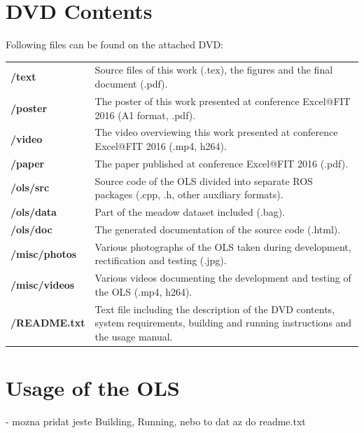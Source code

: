 \chapter{DVD Contents}

Following files can be found on the attached DVD:

{\renewcommand{\arraystretch}{1.2}
\begin{table}[htbp]
	\centering
	\begin{tabularx}{1.0\textwidth}{lX}
		\textbf{/text} & Source files of this work (.tex), the figures and the final document (.pdf). \\
		\textbf{/poster} & The poster of this work presented at conference Excel@FIT 2016 (A1 format, .pdf). \\
		\textbf{/video} & The video  overviewing this work presented at conference Excel@FIT 2016 (.mp4, h264). \\
		\textbf{/paper} & The paper published at conference Excel@FIT 2016 (.pdf). \\
		\textbf{/ols/src} & Source code of the OLS divided into separate ROS packages (.cpp, .h, other auxiliary formats). \\
		\textbf{/ols/data} & Part of the meadow dataset included (.bag). \\
		\textbf{/ols/doc} & The generated documentation of the source code (.html). \\
		\textbf{/misc/photos} & Various photographs of the OLS taken during development, rectification and testing (.jpg). \\
		\textbf{/misc/videos} & Various videos documenting the development and testing of the OLS (.mp4, h264). \\
		\textbf{/README.txt} & Text file including the description of the DVD contents, system requirements, building and running instructions and the usage manual. \\
	\end{tabularx}
	\label{tab:dvd_contents}
\end{table}%
}

\chapter{Usage of the OLS}
- mozna pridat jeste Building, Running, nebo to dat az do readme.txt

